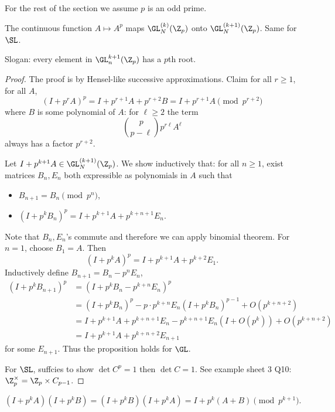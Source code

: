 \documentclass[a4paper]{article}
\begin{document}
For the rest of the section we assume \(p\) is an odd prime.

\begin{proposition}
  The continuous function \(A \mapsto A^p\) maps \(\GL_N^{(k)}(\Z_p)\) onto \(\GL_N^{(k + 1)}(\Z_p)\). Same for \(\SL\).
\end{proposition}

Slogan: every element in \(\GL_n^{k + 1}(\Z_p)\) has a \(p\)th root.

\begin{proof}
  The proof is by Hensel-like successive approximations. Claim for all \(r \geq 1\), for all \(A\),
  \[
    (I + p^rA)^p
    = I + p^{r + 1}A + p^{r + 2}B
    = I + p^{r + 1}A \pmod{p^{r + 2}}
  \]
  where \(B\) is some polynomial of \(A\): for \(\ell \geq 2\) the term
  \[
    \binom{p}{p - \ell} p^{r\ell} A^{\ell}
  \]
  always has a factor \(p^{r + 2}\).

  Let \(I + p^{k + 1}A \in \GL_N^{(k + 1)}(\Z_p)\). We show inductively that: for all \(n \geq 1\), exist matrices \(B_n, E_n\) both expressible as polynomials in \(A\) such that
  \begin{itemize}
  \item \(B_{n + 1} = B_n \pmod{p^n}\),
  \item \((I + p^k B_n)^p = I + p^{k + 1}A + p^{k + n + 1}E_n\).
  \end{itemize}
  Note that \(B_n, E_n\)'s commute and therefore we can apply binomial theorem. For \(n = 1\), choose \(B_1 = A\). Then
  \[
    (I + p^kA)^p = I + p^{k + 1}A + p^{k + 2}E_1.
  \]
  Inductively define \(B_{n + 1} = B_n - p^n E_n\),
  \begin{align*}
    (I + p^k B_{n + 1})^p
    &= (I + p^k B_n - p^{k + n}E_n)^p \\
    &= (I + p^kB_n)^p - p \cdot p^{k + n} E_n (I + p^k B_n)^{p - 1} + O(p^{k + n + 2}) \\
    &= I + p^{k + 1}A + p^{k + n + 1}E_n - p^{k + n + 1} E_n (I + O(p^k)) + O(p^{k + n + 2}) \\
    &= I + p^{k + 1}A + p^{k + n + 2}E_{n + 1}
  \end{align*}
  for some \(E_{n + 1}\). Thus the proposition holds for \(\GL\).

  For \(\SL\), suffcies to show \(\det C^p = 1\) then \(\det C = 1\). See example sheet 3 Q10: \(\Z_p^\times = \Z_p \times C_{p - 1}\).
\end{proof}

\begin{lemma}
  \[
    (I + p^kA)(I + p^kB) = (I + p^k B)(I + p^kA) = I + p^k(A + B) \pmod{p^{k + 1}}.
  \]
\end{lemma}
\end{document}
